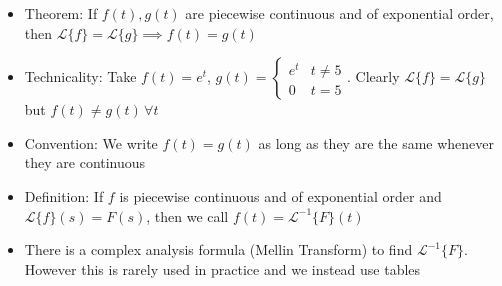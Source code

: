 \documentclass[12pt]{article}
\begin{document}
\begin{itemize}
    \item Theorem: If $f(t), g(t)$ are piecewise continuous and of exponential order, then $\mathcal{L} \{f\} = \mathcal{L} \{g\} \implies f(t) = g(t)$
    \item Technicality: Take $f(t) = e^t$, $g(t) = \begin{cases} 
        e^t & t \neq 5 \\
        0 & t = 5  
     \end{cases}$. Clearly $\mathcal{L} \{f\} = \mathcal{L} \{g\}$ but $f(t) \neq g(t) \, \forall t$
     \item Convention: We write $f(t) = g(t)$ as long as they are the same whenever they are continuous
     \item Definition: If $f$ is piecewise continuous and of exponential order and $\mathcal{L} \{f\} (s) = F(s)$, then we call $f(t) = \mathcal{L}^{-1} \{F\} (t)$
     \item There is a complex analysis formula (Mellin Transform) to find $\mathcal{L}^{-1} \{F\}$. However this is rarely used in practice and we instead use tables
\end{itemize}
\end{document}
